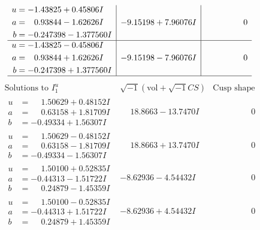 \documentclass[1p]{elsarticle_modified}
\theoremstyle{definition}
\newcommand{\I}{\sqrt{-1}}
\begin{document}
$$\begin{array}{c|c|c}
\begin{aligned}
u &= -1.43825 + 0.45806 I \\
a &= \phantom{-}0.93844 - 1.62626 I \\
b &= -0.247398 - 1.377560 I\end{aligned}
 & -9.15198 + 7.96076 I & \phantom{-0.000000 } 0 \\ \hline\begin{aligned}
u &= -1.43825 - 0.45806 I \\
a &= \phantom{-}0.93844 + 1.62626 I \\
b &= -0.247398 + 1.377560 I\end{aligned}
 & -9.15198 - 7.96076 I & \phantom{-0.000000 } 0\\
 \hline 
 \end{array}$$\newpage$$\begin{array}{c|c|c}  
\text{Solutions to }I^u_{1}& \I (\text{vol} + \sqrt{-1}CS) & \text{Cusp shape}\\
 \hline 
\begin{aligned}
u &= \phantom{-}1.50629 + 0.48152 I \\
a &= \phantom{-}0.63158 + 1.81709 I \\
b &= -0.49334 + 1.56307 I\end{aligned}
 & \phantom{-}18.8663 - 13.7470 I & \phantom{-0.000000 } 0 \\ \hline\begin{aligned}
u &= \phantom{-}1.50629 - 0.48152 I \\
a &= \phantom{-}0.63158 - 1.81709 I \\
b &= -0.49334 - 1.56307 I\end{aligned}
 & \phantom{-}18.8663 + 13.7470 I & \phantom{-0.000000 } 0 \\ \hline\begin{aligned}
u &= \phantom{-}1.50100 + 0.52835 I \\
a &= -0.44313 - 1.51722 I \\
b &= \phantom{-}0.24879 - 1.45359 I\end{aligned}
 & -8.62936 - 4.54432 I & \phantom{-0.000000 } 0 \\ \hline\begin{aligned}
u &= \phantom{-}1.50100 - 0.52835 I \\
a &= -0.44313 + 1.51722 I \\
b &= \phantom{-}0.24879 + 1.45359 I\end{aligned}
 & -8.62936 + 4.54432 I & \phantom{-0.000000 } 0 \\ \hline\begin{aligned}

\end{aligned}
\end{array}$$
\end{document}
